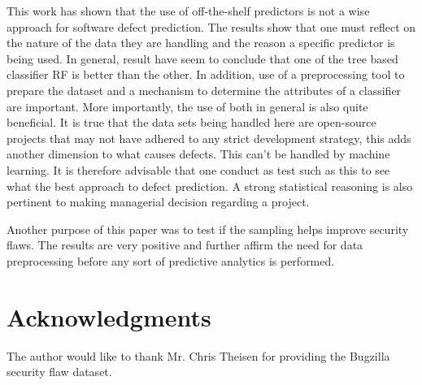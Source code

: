 \documentclass[12pt]{IEEEtran}
\begin{document}
This work has shown that the use of off-the-shelf predictors is not a wise approach for software defect prediction. The results show that one must reflect on the nature of the data they are handling and the reason a specific predictor is being used. In general, result have seem to conclude that one of the tree based classifier RF is better than the other. In addition, use of a preprocessing tool to prepare the dataset and a mechanism to determine the attributes of a classifier are important. More importantly, the use of both in general is also quite beneficial. It is true that the data sets being handled here are open-source projects that may not have adhered to any strict development strategy, this adds another dimension to what causes defects. This can't be handled by machine learning. It is therefore advisable that one conduct as test such as this to see what the best approach to defect prediction. A strong statistical reasoning is also pertinent to making managerial decision regarding a project.

Another purpose of this paper was to test if the sampling helps improve security flaws. The results are very positive and further affirm the need for data preprocessing before any sort of predictive analytics is performed.

\section*{Acknowledgments}

The author would like to thank Mr. Chris Theisen for providing the Bugzilla security flaw dataset. 




\newpage
\appendices


\newpage
\end{document}

